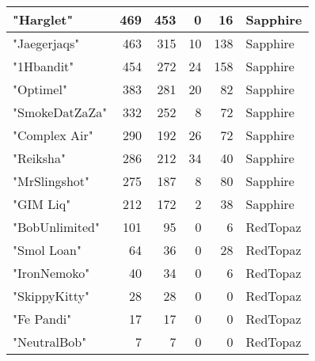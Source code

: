 \documentclass{article}
\begin{document}
\begin{table}[htbp]
\begin{tabular}{|l|r|r|r|r|l|}
"Harglet" & 469 & 453 & 0 & 16 & Sapphire \\ \hline
"Jaegerjaqs" & 463 & 315 & 10 & 138 & Sapphire \\ \hline
"1Hbandit" & 454 & 272 & 24 & 158 & Sapphire \\ \hline
"Optimel" & 383 & 281 & 20 & 82 & Sapphire \\ \hline
"SmokeDatZaZa" & 332 & 252 & 8 & 72 & Sapphire \\ \hline
"Complex Air" & 290 & 192 & 26 & 72 & Sapphire \\ \hline
"Reiksha" & 286 & 212 & 34 & 40 & Sapphire \\ \hline
"MrSlingshot" & 275 & 187 & 8 & 80 & Sapphire \\ \hline
"GIM Liq" & 212 & 172 & 2 & 38 & Sapphire \\ \hline
"BobUnlimited" & 101 & 95 & 0 & 6 & RedTopaz \\ \hline
"Smol Loan" & 64 & 36 & 0 & 28 & RedTopaz \\ \hline
"IronNemoko" & 40 & 34 & 0 & 6 & RedTopaz \\ \hline
"SkippyKitty" & 28 & 28 & 0 & 0 & RedTopaz \\ \hline
"Fe Pandi" & 17 & 17 & 0 & 0 & RedTopaz \\ \hline
"NeutralBob" & 7 & 7 & 0 & 0 & RedTopaz \\ \hline
\end{tabular}
\end{table}
\end{document}
